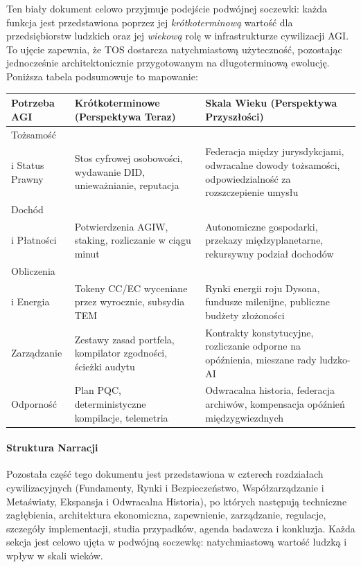 \documentclass[11pt]{article}
\begin{document}
Ten biały dokument celowo przyjmuje podejście podwójnej soczewki: każda funkcja jest przedstawiona poprzez jej \emph{krótkoterminową} wartość dla przedsiębiorstw ludzkich oraz jej \emph{wiekową} rolę w infrastrukturze cywilizacji AGI. To ujęcie zapewnia, że TOS dostarcza natychmiastową użyteczność, pozostając jednocześnie architektonicznie przygotowanym na długoterminową ewolucję. Poniższa tabela podsumowuje to mapowanie:

\begin{longtable}{@{}p{}p{}p{}@{}}
\toprule
\textbf{Potrzeba AGI} & \textbf{Krótkoterminowe (Perspektywa Teraz)} & \textbf{Skala Wieku (Perspektywa Przyszłości)} \\\midrule
Tożsamość \\ i Status Prawny & Stos cyfrowej osobowości, wydawanie DID, unieważnianie, reputacja & Federacja między jurysdykcjami, odwracalne dowody tożsamości, odpowiedzialność za rozszczepienie umysłu \\
Dochód \\ i Płatności & Potwierdzenia AGIW, staking, rozliczanie w ciągu minut & Autonomiczne gospodarki, przekazy międzyplanetarne, rekursywny podział dochodów \\
Obliczenia \\ i Energia & Tokeny CC/EC wyceniane przez wyrocznie, subsydia TEM & Rynki energii roju Dysona, fundusze milenijne, publiczne budżety złożoności \\
Zarządzanie & Zestawy zasad portfela, kompilator zgodności, ścieżki audytu & Kontrakty konstytucyjne, rozliczanie odporne na opóźnienia, mieszane rady ludzko-AI \\
Odporność & Plan PQC, deterministyczne kompilacje, telemetria & Odwracalna historia, federacja archiwów, kompensacja opóźnień międzygwiezdnych \\\bottomrule
\end{longtable}

\paragraph{Struktura Narracji} Pozostała część tego dokumentu jest przedstawiona w czterech rozdziałach cywilizacyjnych (Fundamenty, Rynki i Bezpieczeństwo, Współzarządzanie i Metaświaty, Ekspansja i Odwracalna Historia), po których następują techniczne zagłębienia, architektura ekonomiczna, zapewnienie, zarządzanie, regulacje, szczegóły implementacji, studia przypadków, agenda badawcza i konkluzja. Każda sekcja jest celowo ujęta w podwójną soczewkę: natychmiastową wartość ludzką i wpływ w skali wieków.
\end{document}

